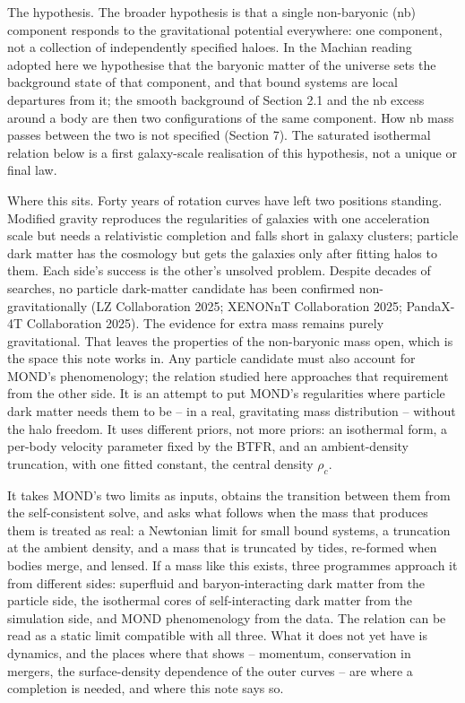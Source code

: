 \documentclass[
  10pt,
]{article}
\begin{document}
The hypothesis. The broader hypothesis is that a single non-baryonic (nb) component responds to the gravitational potential everywhere: one component, not a collection of independently specified haloes. In the Machian reading adopted here we hypothesise that the baryonic matter of the universe sets the background state of that component, and that bound systems are local departures from it; the smooth background of Section 2.1 and the nb excess around a body are then two configurations of the same component. How nb mass passes between the two is not specified (Section 7). The saturated isothermal relation below is a first galaxy-scale realisation of this hypothesis, not a unique or final law.

Where this sits. Forty years of rotation curves have left two positions standing. Modified gravity reproduces the regularities of galaxies with one acceleration scale but needs a relativistic completion and falls short in galaxy clusters; particle dark matter has the cosmology but gets the galaxies only after fitting halos to them. Each side's success is the other's unsolved problem. Despite decades of searches, no particle dark-matter candidate has been confirmed non-gravitationally (LZ Collaboration 2025; XENONnT Collaboration 2025; PandaX-4T Collaboration 2025). The evidence for extra mass remains purely gravitational. That leaves the properties of the non-baryonic mass open, which is the space this note works in. Any particle candidate must also account for MOND's phenomenology; the relation studied here approaches that requirement from the other side. It is an attempt to put MOND's regularities where particle dark matter needs them to be -- in a real, gravitating mass distribution -- without the halo freedom. It uses different priors, not more priors: an isothermal form, a per-body velocity parameter fixed by the BTFR, and an ambient-density truncation, with one fitted constant, the central density $\rho_c$.

It takes MOND's two limits as inputs, obtains the transition between them from the self-consistent solve, and asks what follows when the mass that produces them is treated as real: a Newtonian limit for small bound systems, a truncation at the ambient density, and a mass that is truncated by tides, re-formed when bodies merge, and lensed. If a mass like this exists, three programmes approach it from different sides: superfluid and baryon-interacting dark matter from the particle side, the isothermal cores of self-interacting dark matter from the simulation side, and MOND phenomenology from the data. The relation can be read as a static limit compatible with all three. What it does not yet have is dynamics, and the places where that shows -- momentum, conservation in mergers, the surface-density dependence of the outer curves -- are where a completion is needed, and where this note says so.
\end{document}

